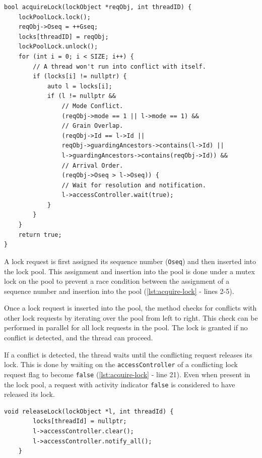\begin{lstlisting}[caption={Acquiring a lock on \texttt{reqObj}.}, label={lst:acquire-lock}]
bool acquireLock(lockObject *reqObj, int threadID) {
    lockPoolLock.lock();
    reqObj->Oseq = ++Gseq;
    locks[threadID] = reqObj;
    lockPoolLock.unlock();
    for (int i = 0; i < SIZE; i++) {
        // A thread won't run into conflict with itself.
        if (locks[i] != nullptr) {
            auto l = locks[i];
            if (l != nullptr &&
                // Mode Conflict.
                (reqObj->mode == 1 || l->mode == 1) &&
                // Grain Overlap.
                (reqObj->Id == l->Id ||
                reqObj->guardingAncestors->contains(l->Id) ||
                l->guardingAncestors->contains(reqObj->Id)) &&
                // Arrival Order.
                (reqObj->Oseq > l->Oseq)) {
                // Wait for resolution and notification.
                l->accessController.wait(true);
            }
        }
    }
    return true;
}
\end{lstlisting}

A lock request is first assigned its sequence number (\texttt{Oseq}) and then inserted into the lock pool. This assignment and insertion into the pool is done under a mutex lock on the pool to prevent a race condition between the assignment of a sequence number and insertion into the pool (\cref{lst:acquire-lock} - lines 2-5).

Once a lock request is inserted into the pool, the method checks for conflicts with other lock requests by iterating over the pool from left to right. This check can be performed in parallel for all lock requests in the pool. The lock is granted if no conflict is detected, and the thread can proceed.

If a conflict is detected, the thread waits until the conflicting request releases its lock. This is done by waiting on the \texttt{accessController} of a conflicting lock request flag to become \texttt{false} (\cref{lst:acquire-lock} - line 21). Even when present in the lock pool, a request with activity indicator \texttt{false} is considered to have released its lock.


\begin{lstlisting}[caption={Releasing a lock.}, label={lst:release-lock}]
    void releaseLock(lockObject *l, int threadId) {
        locks[threadId] = nullptr;
        l->accessController.clear();
        l->accessController.notify_all();
    }
\end{lstlisting}

